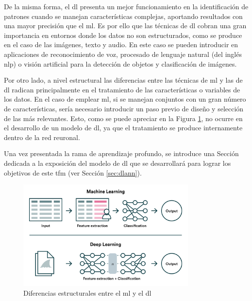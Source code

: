 \vspace{3mm}

De la misma forma, el \gls{dl} presenta un mejor funcionamiento en la identificación de patrones cuando se manejan características complejas, aportando resultados con una mayor precisión que el \gls{ml}. Es por ello que las técnicas de \gls{dl} cobran una gran importancia en entornos donde los datos no son estructurados, como se produce en el caso de las imágenes, texto y audio. En este caso se pueden introducir en aplicaciones de reconocimiento de voz, procesado de lenguaje natural (del inglés \gls{nlp}) o visión artificial para la detección de objetos y clasificación de imágenes. \cite{iageeks}

\vspace{3mm}

Por otro lado, a nivel estructural las diferencias entre las técnicas de \gls{ml} y las de \gls{dl} radican principalmente en el tratamiento de las características o variables de los datos. En el caso de emplear \gls{ml}, si se manejan conjuntos con un gran número de características, sería necesario introducir un paso previo de diseño y selección de las más relevantes. Esto, como se puede apreciar en la Figura \ref{fig:features}, no ocurre en el desarrollo de un modelo de \gls{dl}, ya que el tratamiento se produce internamente dentro de la red reuronal. \cite{valohai}

\vspace{3mm}

Una vez presentada la rama de aprendizaje profundo, se introduce una Sección dedicada a la exposición del modelo de \gls{dl} que se desarrollará para lograr los objetivos de este \gls{tfm} (ver Sección \ref{sec:dlann}). 

\vspace{3mm}

\begin{figure}[h!]
    \centering
    \includegraphics[width=0.8\textwidth]{img/teoria/mlvsdl.png}
    \caption{Diferencias estructurales entre el \acrshort{ml} y el \acrshort{dl} \cite{valohai}}
    \label{fig:features}
\end{figure}

